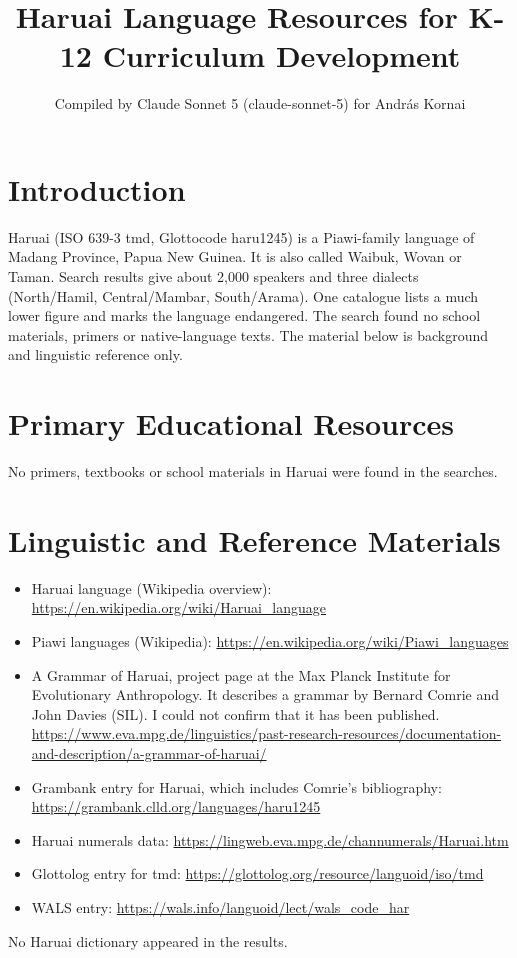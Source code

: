 \documentclass[12pt]{article}
\title{Haruai Language Resources for K-12 Curriculum Development}
\author{Compiled by Claude Sonnet 5 (claude-sonnet-5) for Andr\'as Kornai}
\date{}
\begin{document}
\maketitle

\section{Introduction}
Haruai (ISO 639-3 tmd, Glottocode haru1245) is a Piawi-family language of Madang Province, Papua New Guinea. It is also called Waibuk, Wovan or Taman. Search results give about 2,000 speakers and three dialects (North/Hamil, Central/Mambar, South/Arama). One catalogue lists a much lower figure and marks the language endangered. The search found no school materials, primers or native-language texts. The material below is background and linguistic reference only.

\section{Primary Educational Resources}
No primers, textbooks or school materials in Haruai were found in the searches.

\section{Linguistic and Reference Materials}
\begin{itemize}
\item Haruai language (Wikipedia overview): \url{https://en.wikipedia.org/wiki/Haruai_language}
\item Piawi languages (Wikipedia): \url{https://en.wikipedia.org/wiki/Piawi_languages}
\item A Grammar of Haruai, project page at the Max Planck Institute for Evolutionary Anthropology. It describes a grammar by Bernard Comrie and John Davies (SIL). I could not confirm that it has been published. \url{https://www.eva.mpg.de/linguistics/past-research-resources/documentation-and-description/a-grammar-of-haruai/}
\item Grambank entry for Haruai, which includes Comrie's bibliography: \url{https://grambank.clld.org/languages/haru1245}
\item Haruai numerals data: \url{https://lingweb.eva.mpg.de/channumerals/Haruai.htm}
\item Glottolog entry for tmd: \url{https://glottolog.org/resource/languoid/iso/tmd}
\item WALS entry: \url{https://wals.info/languoid/lect/wals_code_har}
\end{itemize}
No Haruai dictionary appeared in the results.
\end{document}
